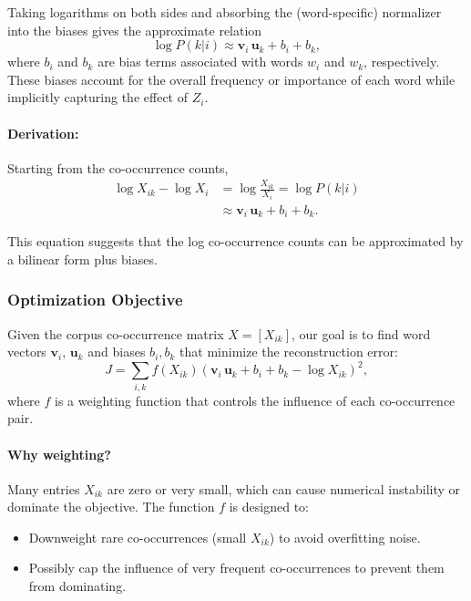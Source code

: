Taking logarithms on both sides and absorbing the (word-specific) normalizer into the biases gives the approximate relation
\begin{equation}
    \log P(k|i) \approx \mathbf{v}_i\,\mathbf{u}_k + b_i + b_k,
    \label{eq:log_prob}
\end{equation}
where \( b_i \) and \( b_k \) are bias terms associated with words \( w_i \) and \( w_k \), respectively. These biases account for the overall frequency or importance of each word while implicitly capturing the effect of \(Z_i\).

\paragraph{Derivation:} Starting from the co-occurrence counts,
\begin{equation}
\begin{aligned}
    \log X_{ik} - \log X_i &= \log \frac{X_{ik}}{X_i} = \log P(k|i) \\
    &\approx \mathbf{v}_i\,\mathbf{u}_k + b_i + b_k.
\end{aligned}
\label{eq:log_xik}
\end{equation}

This equation suggests that the log co-occurrence counts can be approximated by a bilinear form plus biases.

\subsubsection{Optimization Objective}
\label{sec:nlp_optimization_objective_sub}

Given the corpus co-occurrence matrix \( X = [X_{ik}] \), our goal is to find word vectors \( \mathbf{v}_i \), \( \mathbf{u}_k \) and biases \( b_i, b_k \) that minimize the reconstruction error:
\begin{equation}
    J = \sum_{i, k} f(X_{ik}) \left( \mathbf{v}_i\,\mathbf{u}_k + b_i + b_k - \log X_{ik} \right)^2,
\label{eq:glove_objective}
\end{equation}
where \( f \) is a weighting function that controls the influence of each co-occurrence pair.

\paragraph{Why weighting?} Many entries \( X_{ik} \) are zero or very small, which can cause numerical instability or dominate the objective. The function \( f \) is designed to:
\begin{itemize}
    \item Downweight rare co-occurrences (small \( X_{ik} \)) to avoid overfitting noise.
    \item Possibly cap the influence of very frequent co-occurrences to prevent them from dominating.
\end{itemize}

